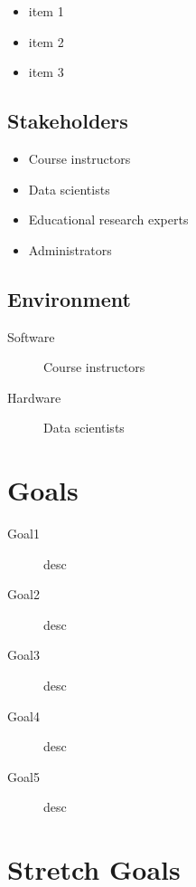 \documentclass{article}
\begin{document}
\begin{itemize}
    \item item 1
    \item item 2
    \item item 3
\end{itemize}


\subsection{Stakeholders}

\begin{itemize}
    \item Course instructors
    \item Data scientists
    \item Educational research experts
    \item Administrators
\end{itemize}

\subsection{Environment}

\begin{description}
    \item [Software] Course instructors
    \item [Hardware] Data scientists
\end{description}


\section{Goals}

\begin{description}
    \item [Goal1] desc
    \item [Goal2] desc
    \item [Goal3] desc
    \item [Goal4] desc
    \item [Goal5] desc
\end{description}

\section{Stretch Goals}
\end{document}
